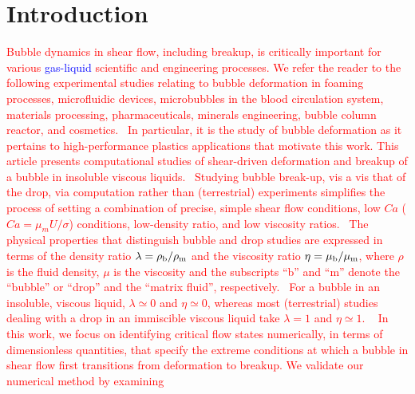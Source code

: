 \documentclass{elsarticle}
\begin{document}
\linenumbers
\section{Introduction}

%
%
\textcolor{red}
{
Bubble dynamics in shear flow, including breakup, is critically important for various \textcolor{blue} {gas-liquid} scientific and engineering processes. 
We refer the reader to the following experimental studies relating to bubble deformation in foaming processes, microfluidic devices, 
microbubbles in the blood circulation system, materials processing, pharmaceuticals, minerals engineering, bubble column reactor, and cosmetics\cite{ChuFinBouAtaHamPug19,MulTobDreFisWin08,BenRodFauPinFerPerGarMirLim18,DreSai15,EFTEKHARI2021837,WANG2023108105,doi:10.1021/acs.langmuir.1c01814,yoshikawa2010bubble}. 
In particular, it is the study of bubble deformation as it pertains to high-performance plastics applications that motivate this work.
This article presents computational studies of shear-driven deformation and breakup of a bubble in insoluble viscous liquids.  
Studying bubble break-up, vis a vis that of the drop, via computation rather than (terrestrial) experiments simplifies the process of setting a combination of precise, simple shear 
flow conditions, low $Ca$ ($Ca=\mu_{m}U/\sigma$) conditions, low-density ratio, and low viscosity ratios.  The physical properties that distinguish 
bubble and drop studies are expressed in terms of the density ratio $\lambda = \rho_{\rm b} / \rho_{\rm m}$ and the viscosity 
ratio $\eta = \mu_{\rm b} / \mu_{\rm m}$, where $\rho$ is the fluid density, $\mu$ is the viscosity and the subscripts ``b'' and ``m'' 
denote the ``bubble'' or ``drop'' and the ``matrix fluid'', respectively.  For a bubble in an insoluble, viscous liquid, $\lambda \simeq 0$ 
and $\eta \simeq 0$, whereas most (terrestrial) studies dealing with a drop in an immiscible viscous liquid take $\lambda =1$ and $\eta \simeq 1$.  
%
In this work, we focus on identifying critical flow states numerically, in terms of dimensionless quantities, that specify the extreme 
conditions at which a bubble in shear flow first transitions from deformation to breakup.  We validate our numerical method by examining 
}
\end{document}
